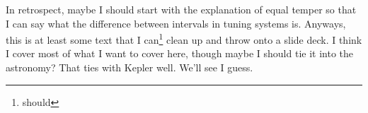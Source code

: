 \documentclass[12pt]{article}[titlepage]
\newcommand{\1}{\={a}}
\newcommand{\2}{\={e}}
\newcommand{\3}{\={\i}}
\newcommand{\4}{\=o}
\newcommand{\5}{\=u}
\newcommand{\6}{\={A}}
\renewcommand{\,}{\textsuperscript{,}}
\begin{document}
In retrospect, maybe I should start with the explanation of equal temper so that I can say what the difference between intervals in tuning systems is.
Anyways, this is at least some text that I can\footnote{should} clean up and throw onto a slide deck.
I think I cover most of what I want to cover here, though maybe I should tie it into the astronomy?
That ties with Kepler well.
We'll see I guess.
\end{document}
